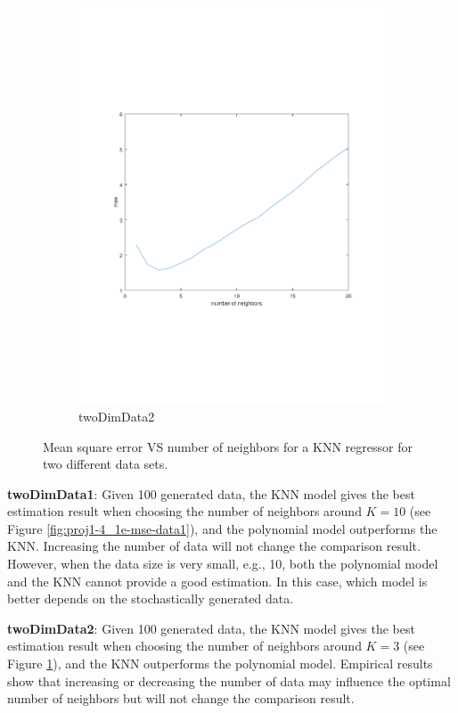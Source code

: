 \documentclass[]{article}
\begin{document}
\begin{figure}[ht]
\begin{subfigure}{.49\textwidth}
	\includegraphics[trim= 10cm 5cm 10cm 5cm, scale=0.4]{proj1-4_1e-mse-data2}
	\caption{twoDimData2}
	\label{fig:proj1-4_1e-mse-data2}
\end{subfigure}
\caption{Mean square error VS number of neighbors for a KNN regressor for two different data sets.}
\label{fig:proj1-4_1e-mse}
\end{figure}
\textbf{twoDimData1}: Given 100 generated data, the KNN model gives the best estimation result when choosing the number of neighbors around $K=10$ (see Figure \ref{fig:proj1-4_1e-mse-data1}), and the polynomial model outperforms the KNN. Increasing the number of data will not change the comparison result. However, when the data size is very small, e.g., 10, both the polynomial model and the KNN cannot provide a good estimation. In this case, which model is better depends on the stochastically generated data.

\textbf{twoDimData2}: Given 100 generated data, the KNN model gives the best estimation result when choosing the number of neighbors around $K=3$ (see Figure \ref{fig:proj1-4_1e-mse-data2}), and the KNN outperforms the polynomial model. Empirical results show that increasing or decreasing the number of data may influence the optimal number of neighbors but will not change the comparison result.
\end{document}
